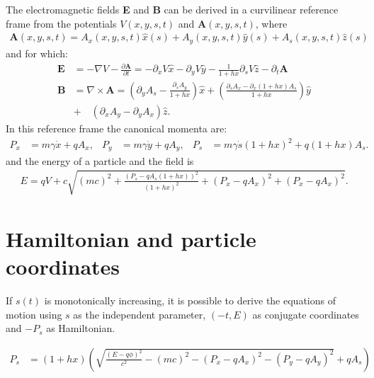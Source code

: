 The electromagnetic fields {\bf E} and {\bf B} can be derived in a curvilinear
reference frame from the potentials $V(x,y,s,t)$ and $\mathbf{A}(x,y,s,t)$, where
\begin{align}
\mathbf{A}(x,y,s,t)=A_x(x,y,s,t) \hat x(s) + A_y(x,y,s,t) \hat y(s) + A_s(x,y,s,t) \hat z(s)
\end{align}
and for which:
\begin{align}
  \mathbf{E}  &= -\nabla V - \frac{\partial \mathbf{A}}{\partial t} 
               = -\partial_x V \hat x - \partial_y V \hat y -
  \frac{1}{1+h x}  \partial_s V \hat z - \partial_t \mathbf{A}\\
  \mathbf{B} &= \nabla\times\mathbf{A}  =
  \left(\partial_y A_s - \frac{\partial_s  A_y}{1+h x} \right) \hat x 
  +\left(\frac{\partial_s A_x-\partial_x (1+h x) A_s }{1+h x} \right)\hat y \\
  &+\quad \left(\partial_x A_y - \partial_y A_x \right) \hat z.
\end{align}
In this reference frame the canonical momenta are:
\begin{align}
  P_x&=m \gamma \dot x + q A_x, &
  P_y&=m \gamma \dot y + q A_y, &
  P_s&=m \gamma \dot s (1 + h x)^2 + q (1 + h x) A_s.
\end{align}
and the energy of a particle and the field is
\begin{align}
E=qV + c \sqrt{(mc)^2
              +\frac{(P_s- q A_s(1+hx))^2}{(1+hx)^2}
              +(P_x-q A_x)^2 + (P_x-q A_x)^2}.
\end{align}







\section{Hamiltonian and particle coordinates}

If $s(t)$ is monotonically increasing, it is possible to derive the equations
of motion using $s$ as the independent parameter, $(-t, E)$ as conjugate coordinates and $-P_s$ as Hamiltonian.

\begin{align}
  P_s&= (1+h x) \left( 
       \sqrt{ \frac{(E-q\phi)^2}{c^2} - (mc)^2
           - (P_x - q A_x)^2
           - (P_y - q A_y)^2}
       +q A_s
    \right)
\end{align}

